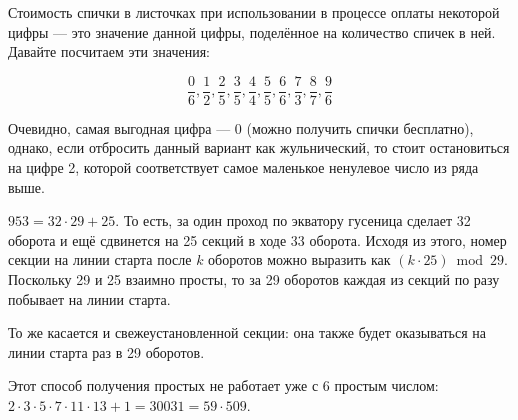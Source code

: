 \begin{itemize}
\itA Стоимость спички в листочках при использовании в процессе
оплаты некоторой цифры --- это значение данной цифры, 
поделённое на количество спичек в ней. Давайте посчитаем эти значения:

$$\frac{0}{6}, \frac{1}{2}, \frac{2}{5}, \frac{3}{5}, \frac{4}{4}, \frac{5}{5}, \frac{6}{6}, \frac{7}{3}, \frac{8}{7}, \frac{9}{6}$$

Очевидно, самая выгодная цифра --- 0 (можно получить спички бесплатно), однако, если
отбросить данный вариант как жульнический, то стоит остановиться на цифре 2, которой соответствует
самое маленькое ненулевое число из ряда выше.

\itB $953 = 32 \cdot 29 + 25$. То есть, за один проход по экватору 
гусеница сделает 32 оборота и ещё сдвинется на 25
секций в ходе 33 оборота. Исходя из этого, номер секции на линии старта после $k$ оборотов можно
выразить как $(k \cdot 25) \bmod 29$. Поскольку 29 и 25 взаимно просты, то за 29 оборотов каждая из 
секций по разу побывает
на линии старта.

То же касается и свежеустановленной секции: она также будет оказываться 
на линии старта раз в 29 оборотов. 

\itC Этот способ получения простых не работает уже с 6 
простым числом: $2\cdot 3 \cdot 5 \cdot 7 \cdot 11 \cdot 13 + 1 = 30031 = 59 \cdot 509$.

\end{itemize}

